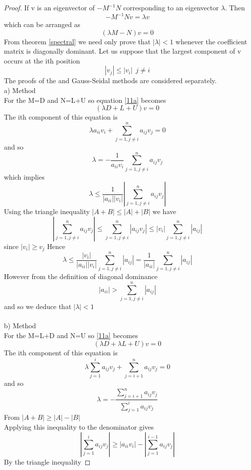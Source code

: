 \begin{proof}
If v is an eigenvector of $-M^{-1}N$ corresponding to an eigenvector $\lambda$. Then
\[-M^{-1}Nv=\lambda v\]
which can be arranged as
\begin{equation}
\label{11a}
(\lambda M-N)v=0
\end{equation}
From theorem \ref{spectral} we need only prove that $|\lambda|<1$ whenever the coefficient
matrix is diagonally dominant.  Let us suppose that the largest component of v
occurs at the ith position
\[|v_{j}| \leq |v_{i}| \ \ j\not= i 
\]
The proofs of the  and Gauss-Seidal methods are considered separately.\\
a)  Method\\
For the  M=D and N=L+U so equation \ref{11a} becomes
\[(\lambda D +L+U)v=0\]
The ith component of this equation is
\[ \lambda a_{ii}v_i + \sum_{j=1,j\not=i}^{n}a_{ij}v_j=0 \]
and so
\[ \lambda = - \frac{1}{a_{ii}v_i } \sum_{j=1,j\not=i}^{n}a_{ij}v_j\]
which implies 
\[ \lambda \leq \frac{1}{|a_{ii}||v_i| } |\sum_{j=1,j\not=i}^{n}a_{ij}v_j|\]
Using the triangle inequality $|A+B| \leq |A|+|B|$ we have
\[|\sum_{j=1,j\not=i}^{n}a_{ij}v_j|\leq \sum_{j=1,j\not=i}^{n}|a_{ij}v_{j}|
\leq |v_i| \sum_{j=1,j\not=i}^{n} |a_{ij}| \]
since $|v_i| \geq v_j $
Hence
\[ \lambda \leq \frac{|v_i|}{|a_{ii}||v_i| } \sum_{j=1,j\not=i}^{n}|a_{ij}|=
\frac{1}{|a_{ii}| } \sum_{j=1,j\not=i}^{n}|a_{ij}|\]
However from the definition of diagonal dominance
\[ |a_{ii}| > \sum_{j=1,j\not=i}^{n}|a_{ij}| \]
and so we deduce that $|\lambda|< 1 $\\
\\
b) Method\\
For the M=L+D and N=U so \ref{11a} becomes
\[(\lambda D +\lambda L+U)v=0\]
The ith component of this equation is
\[ \lambda \sum_{j=1}^{i}a_{ij}v_j + \sum_{j=i+1}^{n}a_{ij}v_j=0 \]
and so
\begin{equation}
\label{A}
 \lambda =-\frac{\sum_{j=i+1}^{n}a_{ij}v_j}{ \sum_{j=1}^{i}a_{ij}v_j}
\end{equation}
From $|A+B| \geq |A| - |B| $\\
Applying this inequality to the denominator gives
\[ \left|\sum_{j=1}^{i}a_{ij}v_j \right| \geq |a_{ii}v_{i}| -\left|\sum_{j=1}^{i-1}a_{ij}v_j \right| \]
By the triangle inequality


\end{proof}
